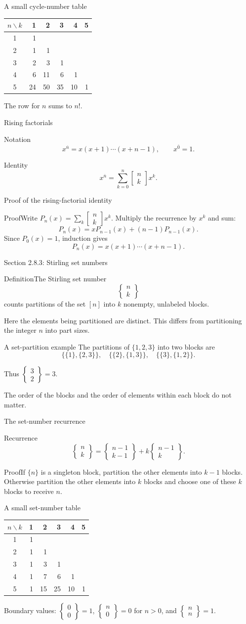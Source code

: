 \documentclass[aspectratio=169,11pt]{beamer}
\newcommand{\Def}[2]{\begin{block}{#1}#2\end{block}}
\newcommand{\Thm}[2]{\begin{block}{#1}#2\end{block}}
\renewcommand{\Proof}[1]{\begin{block}{Proof}\normalsize #1\end{block}}
\newcommand{\rise}[2]{#1^{\overline{#2}}}
\newcommand{\stir}[2]{\left\{\begin{matrix}#1\\#2\end{matrix}\right\}}
\newcommand{\cyc}[2]{\left[\begin{matrix}#1\\#2\end{matrix}\right]}
\newcommand{\gap}{\par\medskip}
\begin{document}
\begin{frame}{A small cycle-number table}
\large
\begin{center}\renewcommand{\arraystretch}{1.5}
\begin{tabular}{c|rrrrr}
$n\backslash k$&1&2&3&4&5\\\hline
1&1\\2&1&1\\3&2&3&1\\4&6&11&6&1\\5&24&50&35&10&1
\end{tabular}\end{center}
\gap The row for $n$ sums to $n!$.
\end{frame}
\begin{frame}{Rising factorials}
\large
\Def{Notation}{\[\rise xn=x(x+1)\cdots(x+n-1),\qquad\rise x0=1.\]}
\Thm{Identity}{\[\rise xn=\sum_{k=0}^n\cyc nkx^k.\]}
\end{frame}
\begin{frame}{Proof of the rising-factorial identity}
\large
\Proof{Write $P_n(x)=\sum_k\cyc nkx^k$. Multiply the recurrence by $x^k$ and sum:
\[P_n(x)=xP_{n-1}(x)+(n-1)P_{n-1}(x).
\]
Since $P_0(x)=1$, induction gives
\[P_n(x)=x(x+1)\cdots(x+n-1).\]}
\end{frame}
\begin{frame}{Section 2.8.3: Stirling set numbers}
\large
\Def{Definition}{The Stirling set number
\[\stir nk\]
counts partitions of the set $[n]$ into $k$ nonempty, unlabeled blocks.}
\gap Here the elements being partitioned are distinct. This differs from partitioning the integer $n$ into part sizes.
\end{frame}
\begin{frame}{A set-partition example}
\large
The partitions of $\{1,2,3\}$ into two blocks are
\[\{\{1\},\{2,3\}\},\quad\{\{2\},\{1,3\}\},\quad\{\{3\},\{1,2\}\}.\]
\gap Thus $\stir32=3$.
\gap The order of the blocks and the order of elements within each block do not matter.
\end{frame}
\begin{frame}{The set-number recurrence}
\large
\Thm{Recurrence}{\[\stir nk=\stir{n-1}{k-1}+k\stir{n-1}k.\]}
\Proof{If $\{n\}$ is a singleton block, partition the other elements into $k-1$ blocks. Otherwise partition the other elements into $k$ blocks and choose one of these $k$ blocks to receive $n$.}
\end{frame}
\begin{frame}{A small set-number table}
\large
\begin{center}\renewcommand{\arraystretch}{1.5}
\begin{tabular}{c|rrrrr}
$n\backslash k$&1&2&3&4&5\\\hline
1&1\\2&1&1\\3&1&3&1\\4&1&7&6&1\\5&1&15&25&10&1
\end{tabular}\end{center}
\gap Boundary values: $\stir00=1$, $\stir n0=0$ for $n>0$, and $\stir nn=1$.
\end{frame}
\end{document}
